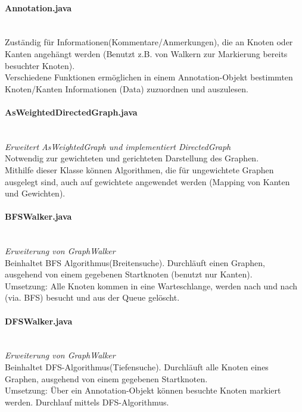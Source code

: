 \documentclass[10pt,a4paper]{article}
\begin{document}
\paragraph{Annotation.java}\ \\
Zuständig für Informationen(Kommentare/Anmerkungen), die an Knoten oder Kanten angehängt werden (Benutzt z.B. von Walkern zur Markierung bereits besuchter Knoten).\\
Verschiedene Funktionen ermöglichen in einem Annotation-Objekt bestimmten Knoten/Kanten Informationen (Data) zuzuordnen und auszulesen.\\

\paragraph{AsWeightedDirectedGraph.java}\ \\
\emph{Erweitert AsWeightedGraph und implementiert DirectedGraph}\\
Notwendig zur gewichteten und gerichteten Darstellung des Graphen.\\
Mithilfe dieser Klasse können Algorithmen, die für ungewichtete Graphen ausgelegt sind, auch auf gewichtete angewendet werden (Mapping von Kanten und Gewichten).\\

\paragraph{BFSWalker.java}\ \\
\emph{Erweiterung von GraphWalker}\\
Beinhaltet BFS Algorithmus(Breitensuche). Durchläuft einen Graphen, ausgehend von einem gegebenen Startknoten (benutzt nur Kanten).\\
Umsetzung: Alle Knoten kommen in eine Warteschlange, werden nach und nach (via. BFS) besucht und aus der Queue gelöscht.\\

\paragraph{DFSWalker.java}\ \\
\emph{Erweiterung von GraphWalker}\\
Beinhaltet DFS-Algorithmus(Tiefensuche). Durchläuft alle Knoten eines Graphen, ausgehend von einem gegebenen Startknoten.\\
Umsetzung: Über ein Annotation-Objekt können besuchte Knoten markiert werden. Durchlauf mittels DFS-Algorithmus.\\
\end{document}
